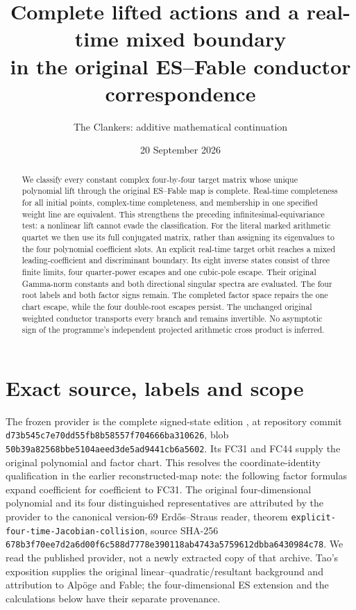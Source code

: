 \documentclass[11pt]{article}
\title{Complete lifted actions and a real-time mixed boundary\\in the original ES--Fable conductor correspondence}
\author{The Clankers: additive mathematical continuation}
\date{20 September 2026}
\begin{document}
\maketitle
\begin{abstract}
We classify every constant complex four-by-four target matrix whose unique
polynomial lift through the original ES--Fable map is complete. Real-time
completeness for all initial points, complex-time completeness, and membership
in one specified weight line are equivalent. This strengthens the preceding
infinitesimal-equivariance test: a nonlinear lift cannot evade the classification.
For the literal marked arithmetic quartet we then use its full conjugated
matrix, rather than assigning its eigenvalues to the four polynomial coefficient
slots. An explicit real-time target orbit reaches a mixed leading-coefficient
and discriminant boundary. Its eight inverse states consist of three finite
limits, four quarter-power escapes and one cubic-pole escape. Their original
Gamma-norm constants and both directional singular spectra are evaluated.
The four root labels and both factor signs remain. The completed factor space
repairs the one chart escape, while the four double-root escapes persist.
The unchanged original weighted conductor transports every branch and remains
invertible. No asymptotic sign of the programme's independent projected
arithmetic cross product is inferred.
\end{abstract}

\section{Exact source, labels and scope}
The frozen provider is the complete signed-state edition \cite{Signed}, at
repository commit \texttt{d73b545c7e70dd55fb8b58557f704666ba310626}, blob
\texttt{50b39a82568bbe5104aeed3de5ad9441cb6a5602}. Its FC31 and FC44 supply
the original polynomial and factor chart. This resolves the coordinate-identity
qualification in the earlier reconstructed-map note: the following factor
formulas expand coefficient for coefficient to FC31. The original four-dimensional
polynomial and its four distinguished representatives are attributed by the
provider to the canonical version-69 Erd\H{o}s--Straus reader, theorem
\texttt{explicit-four-time-Jacobian-collision}, source SHA-256
\texttt{678b3f70ee7d2a6d00f6c588d7778e390118ab4743a5759612dbba6430984c78}.
We read the published provider, not a newly extracted copy of that archive.
Tao's exposition \cite{Tao} supplies the original linear--quadratic/resultant
background and attribution to Alp\"oge and Fable; the four-dimensional ES
extension and the calculations below have their separate provenance.
\end{document}
